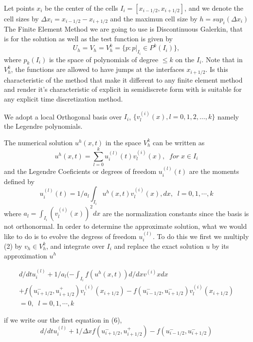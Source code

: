 \documentclass[11pt,fleqn]{report}
\begin{document}
Let points $x_i$ be the center of the cells $I_i = [x_{i-1/2},x_{i+1/2}]$, and we denote the cell sizes by $\Delta x_i = x_{i-1/2}-x_{i+1/2}$ and the maximun cell size by $h =  sup_i(\Delta x_i)$ The Finite Element Method we are going to use is Discontinuous Galerkin, that is for the solution as well as the test function is given by
\begin{equation}
 U_h = V_h = V_h^k = \{p : p|_{I_i} \in P^k(I_i)\},
\end{equation}
where $p_k(I_i)$ is the space of polynomials of degree $\leq k$ on the $I_i$. Note that in $V_h^k$, the functions are allowed to have jumps at the interfaces $x_{i+1/2}$. Is this characteristic of the method that make it different to any finite element method and render it's characteristic of explicit in semidiscrete form with is suitable for any explicit time discretization method.

We adopt a local Orthogonal basis over $I_i$, $\{v_l^{(i)}(x), l=0,1,2, \dots, k\}$ namely the Legendre polynomials.

The numerical solution $u^h(x,t)$ in the space $V_h^k$ can be written as
\begin{equation}
 u^h(x,t) = \sum_{l=0}^{k} u_i^{(l)}(t)v_l^({i})(x), \; \; for \; x \in I_i
\end{equation}
and the Legendre Coeficients or degrees of freedom $u_i^{(l)}(t)$ are the moments defined by
\begin{equation}
 u_i^{(l)}(t) = 1/a_l \int_{I_i} u^h(x,t)v_l^{(i)}(x),dx, \; \; l = 0,1, \cdots,k
\end{equation}
where $a_l = \int_{I_i} (v_l^{(i)}(x))^2 dx$ are the normalization constants since the basis is not orthonormal. In order to determine the approximate solution, what we would like to do is to evolve the degress of freedom $u_i^{(l)}$. To do this we first we multiply (2) by $v_h \in V_h^k$, and integrate over $I_i$ and replace the exact solution $u$ by its approximation $u^h$

\begin{eqnarray}
 d/dt u_i^{(l)} + 1/a_l(-\int_{I_i} f(u^h(x,t))d/dx v^{(i)}x dx \\ \nonumber
 	+ f(u_{i+1/2}^{-},u_{i+1/2}^{+})v_l^{(i)}(x_{i+1/2}) 
 	- f(u_{i-1/2}^{-},u_{i+1/2}^{-})v_l^{(i)}(x_{i+1/2}) \\ \nonumber
	= 0, \; \;  l = 0,1, \cdots ,k
\end{eqnarray}

if we write our the first equation in (6),
\begin{equation}
 d/dt u_i^{(l)} + 1/{\Delta x}f(u_{i+1/2}^{-},u_{i+1/2}^{+})
 	- f(u_{i-1/2}^{-},u_{i+1/2}^{-})
\end{equation}
\end{document}

